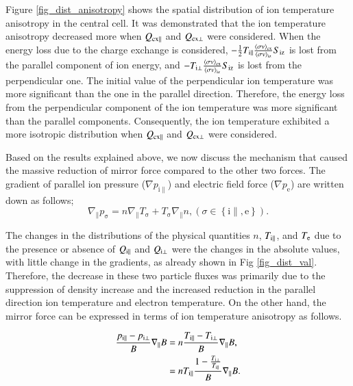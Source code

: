 \documentclass{jasse}%
\begin{document}
Figure \ref{fig_dist_anisotropy} shows the spatial distribution of ion temperature anisotropy in the central cell. It was demonstrated that the ion temperature anisotropy decreased more when $Q_{\rm{cx}\parallel}$ and $Q_{\rm{cx}\bot}$ were considered. When the energy loss due to the charge exchange is considered, $-\frac{1}{2}T_{\rm{i\parallel}}\frac{{\left\langle \sigma v\right\rangle}_{\rm{cx}}}{{\left\langle \sigma v\right\rangle}_{\rm{iz}}}S_{\rm{iz}}$ is lost from the parallel component of ion energy, and $-T_{\rm{i\bot}}\frac{{\left\langle \sigma v\right\rangle}_{\rm{cx}}}{{\left\langle \sigma v\right\rangle}_{\rm{iz}}}S_{\rm{iz}}$ is lost from the perpendicular one. The initial value of the perpendicular ion temperature was more significant than the one in the parallel direction. Therefore, the energy loss from the perpendicular component of the ion temperature was more significant than the parallel components. Consequently, the ion temperature exhibited a more isotropic distribution when $Q_{\rm{cx}\parallel}$ and $Q_{\rm{cx}\bot}$ were considered. 

Based on the results explained above, we now discuss the mechanism that caused the massive reduction of mirror force compared to the other two forces. The gradient of parallel ion pressure ($\nabla p_{\mathrm{i}\parallel}$) and electric field force ($\nabla p_{\mathrm{e}}$) are written down as follows;
\begin{equation}
    \nabla_{\parallel} p_{\mathrm{\sigma}} = n \nabla_{\parallel} T_{\mathrm{\sigma}} + T_{\mathrm{\sigma}} \nabla _{\parallel}n , (\sigma \in \left\{ \mathrm{i}\parallel, \mathrm{e}\right\}).
\end{equation}

The changes in the distributions of the physical quantities $n$, $T_{\rm{i}\parallel}$, and $T_{\rm{e}}$ due to the presence or absence of $Q_{\rm{i}\parallel}$ and $Q_{\rm{i}\bot}$ were the changes in the absolute values, with little change in the gradients, as already shown in Fig \ref{fig_dist_val}. Therefore, the decrease in these two particle fluxes was primarily due to the suppression of density increase and the increased reduction in the parallel direction ion temperature and electron temperature. On the other hand, the mirror force can be expressed in terms of ion temperature anisotropy as follows.

\begin{align}
    \frac{p_{\mathrm{i}\parallel}-p_{\mathrm{i}\bot}}{B} \nabla_{\parallel} B &= n\frac{T_{\mathrm{i}\parallel}-T_{\mathrm{i}\bot}}{B} \nabla_{\parallel} B, \\
    &= nT_{\rm{i}\parallel}\frac{1-\frac{T_{\rm{i}\bot}}{T_{\rm{i}\parallel}}}{B}\nabla_{\parallel} B.\label{eq.mirror}
\end{align}
\end{document}
